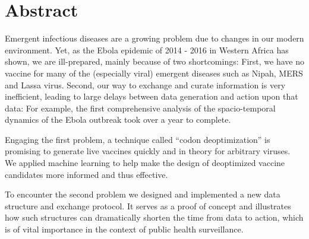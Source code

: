 \section*{Abstract}

Emergent infectious diseases are a growing problem due to changes in our modern environment. Yet, as the Ebola epidemic of 2014 - 2016 in Western Africa has shown, we are ill-prepared, mainly because of two shortcomings: First, we have no vaccine for many of the (especially viral) emergent diseases such as Nipah, MERS and Lassa virus. Second, our way to exchange and curate information is very inefficient, leading to large delays between data generation and action upon that data: For example, the first comprehensive analysis of the spacio-temporal dynamics of the Ebola outbreak took over a year to complete.

Engaging the first problem, a technique called ``codon deoptimization'' is promising to generate live vaccines quickly and in theory for arbitrary viruses. We applied machine learning to help make the design of deoptimized vaccine candidates more informed and thus effective.

To encounter the second problem we designed and implemented a new data structure and exchange protocol. It serves as a proof of concept and illustrates how such structures can dramatically shorten the time from data to action, which is of vital importance in the context of public health surveillance.
